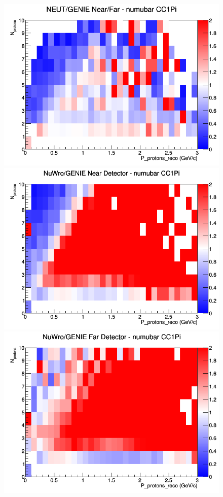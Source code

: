 \begin{figure}[h]
\endminipage
{}
\includegraphics[width=\linewidth]{eff_N_P/GAr/protons/ratios/CC1Pi_NEUT_GENIE_numubar_NF_N_P.png}
\endminipage
\newline
{}
\includegraphics[width=\linewidth]{eff_N_P/GAr/protons/ratios/CC1Pi_NuWro_GENIE_numubar_near_N_P.png}
\endminipage
{}
\includegraphics[width=\linewidth]{eff_N_P/GAr/protons/ratios/CC1Pi_NuWro_GENIE_numubar_far_N_P.png}

\end{figure}
